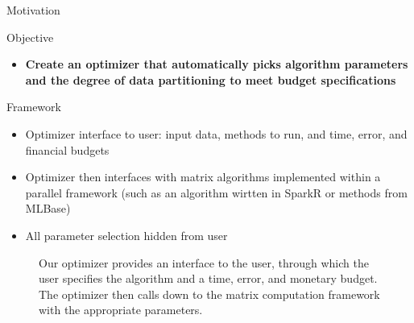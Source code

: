 \documentclass[final]{beamer}
\begin{document}
{\begin{frame}{}
\begin{center}
\begin{columns}[t]
\begin{column}{0.32\textwidth}
\begin{block}{\huge Motivation}
\end{block}
\vspace{1.2cm}

    \begin{block}{\huge Objective}
\vspace{.4cm}
\begin{itemize}
\item {\bf \large Create an optimizer that automatically picks algorithm parameters and the degree of data partitioning to meet budget specifications}
\end{itemize}

\vspace{.5cm}

\end{block}

\vspace{1.2cm}

    \begin{block}{\huge Framework}
\vspace{.5cm}
\begin{itemize}
\item Optimizer interface to user: input data, methods to run, and time, error, and financial budgets
\item Optimizer then interfaces with matrix algorithms implemented within a parallel framework (such as an algorithm wirtten in SparkR or methods from MLBase)
\item All parameter selection hidden from user
\end{itemize}    
\vspace{.7cm}
\begin{center}
\begin{figure}
\caption[width=0.5\textwidth]{Our optimizer provides an interface to the user, through which the user specifies the algorithm and a time, error, and monetary budget. The optimizer then calls down to the matrix computation framework with the appropriate parameters.}
\end{figure}
\end{center}
\end{block}


\end{column}
\end{columns}
\end{center}
\end{frame}}
\end{document}
